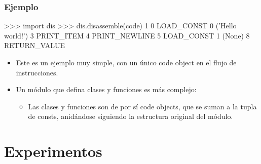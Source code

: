 \documentclass[9pt, notes=hide]{beamer}
\begin{document}
\begin{frame}[fragile]
    \frametitle{Ejemplo}

\begin{python}
>>> import dis
>>> dis.disassemble(code)
  1           0 LOAD_CONST               0 ('Hello world!')
              3 PRINT_ITEM
              4 PRINT_NEWLINE
              5 LOAD_CONST               1 (None)
              8 RETURN_VALUE
\end{python}

\vspace{0.5cm}

\begin{itemize}
    \item Este es un ejemplo muy simple, con un único code object en el flujo de instrucciones.
    \item Un módulo que defina clases y funciones es más complejo:
        \begin{itemize}
            \item Las clases y funciones son de por sí code objects, que se suman a la tupla de consts, anidándose siguiendo la estructura original del módulo.
        \end{itemize}
\end{itemize}

\end{frame}


\section{Experimentos}

% 
\end{document}
